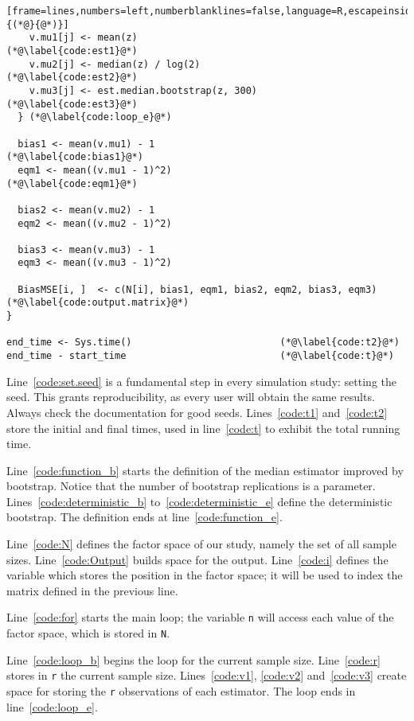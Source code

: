 \begin{lstlisting}[frame=lines,numbers=left,numberblanklines=false,language=R,escapeinside={(*@}{@*)}]
    v.mu1[j] <- mean(z)							(*@\label{code:est1}@*)
    v.mu2[j] <- median(z) / log(2)				(*@\label{code:est2}@*)
    v.mu3[j] <- est.median.bootstrap(z, 300)	(*@\label{code:est3}@*)
  }	(*@\label{code:loop_e}@*)
  
  bias1 <- mean(v.mu1) - 1						(*@\label{code:bias1}@*)
  eqm1 <- mean((v.mu1 - 1)^2)					(*@\label{code:eqm1}@*)
  
  bias2 <- mean(v.mu2) - 1
  eqm2 <- mean((v.mu2 - 1)^2)
  
  bias3 <- mean(v.mu3) - 1
  eqm3 <- mean((v.mu3 - 1)^2)
  
  BiasMSE[i, ]  <- c(N[i], bias1, eqm1, bias2, eqm2, bias3, eqm3)	(*@\label{code:output.matrix}@*)
}

end_time <- Sys.time()							(*@\label{code:t2}@*)
end_time - start_time							(*@\label{code:t}@*)
\end{lstlisting}

Line~\ref{code:set.seed} is a fundamental step in every simulation study: setting the seed.
This grants reproducibility, as every user will obtain the same results.
Always check the documentation for good seeds.
Lines~\ref{code:t1} and~\ref{code:t2} store the initial and final times, used in line~\ref{code:t} to exhibit the total running time.

Line~\ref{code:function_b} starts the definition of the median estimator improved by bootstrap.
Notice that the number of bootstrap replications is a parameter.
Lines~\ref{code:deterministic_b} to~\ref{code:deterministic_e} define the deterministic bootstrap.
The definition ends at line~\ref{code:function_e}.

Line~\ref{code:N} defines the factor space of our study, namely the set of all sample sizes.
Line~\ref{code:Output} builds space for the output.
Line~\ref{code:i} defines the variable which stores the position in the factor space; it will be used to index the matrix defined in the previous line.

Line~\ref{code:for} starts the main loop; the variable \verb|n| will access each value of the factor space, which is stored in \verb|N|.

Line~\ref{code:loop_b} begins the loop for the current sample size.
Line~\ref{code:r} stores in \verb|r| the current sample size.
Lines~\ref{code:v1}, \ref{code:v2} and~\ref{code:v3} create space for storing the \verb|r| observations of each estimator.
The loop ends in line~\ref{code:loop_e}.

